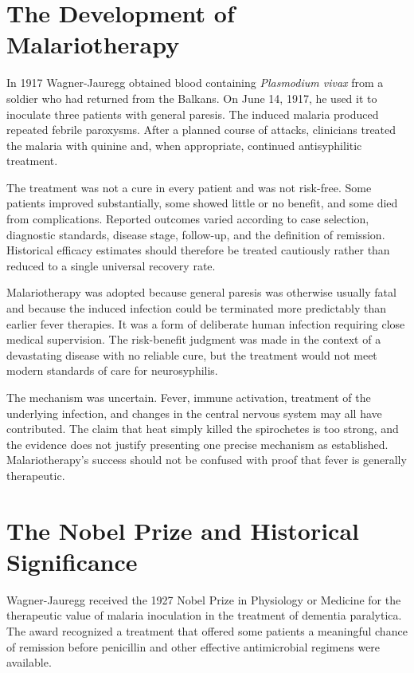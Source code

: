 \section{The Development of Malariotherapy}

In 1917 Wagner-Jauregg obtained blood containing \emph{Plasmodium vivax} from a soldier who had returned from the Balkans. On June 14, 1917, he used it to inoculate three patients with general paresis. The induced malaria produced repeated febrile paroxysms. After a planned course of attacks, clinicians treated the malaria with quinine and, when appropriate, continued antisyphilitic treatment.

The treatment was not a cure in every patient and was not risk-free. Some patients improved substantially, some showed little or no benefit, and some died from complications. Reported outcomes varied according to case selection, diagnostic standards, disease stage, follow-up, and the definition of remission. Historical efficacy estimates should therefore be treated cautiously rather than reduced to a single universal recovery rate.

Malariotherapy was adopted because general paresis was otherwise usually fatal and because the induced infection could be terminated more predictably than earlier fever therapies. It was a form of deliberate human infection requiring close medical supervision. The risk-benefit judgment was made in the context of a devastating disease with no reliable cure, but the treatment would not meet modern standards of care for neurosyphilis.

The mechanism was uncertain. Fever, immune activation, treatment of the underlying infection, and changes in the central nervous system may all have contributed. The claim that heat simply killed the spirochetes is too strong, and the evidence does not justify presenting one precise mechanism as established. Malariotherapy's success should not be confused with proof that fever is generally therapeutic.

\section{The Nobel Prize and Historical Significance}

Wagner-Jauregg received the 1927 Nobel Prize in Physiology or Medicine for the therapeutic value of malaria inoculation in the treatment of dementia paralytica\cite{nobel-1927}. The award recognized a treatment that offered some patients a meaningful chance of remission before penicillin and other effective antimicrobial regimens were available.

